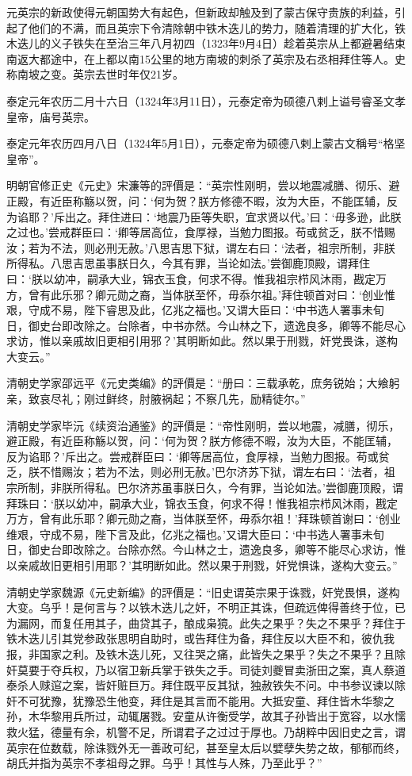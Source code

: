 元英宗的新政使得元朝国势大有起色，但新政却触及到了蒙古保守贵族的利益，引起了他们的不满，而且英宗下令清除朝中铁木迭儿的势力，随着清理的扩大化，铁木迭儿的义子铁失在至治三年八月初四（1323年9月4日）趁着英宗从上都避暑结束南返大都途中，在上都以南15公里的地方南坡的刺杀了英宗及右丞相拜住等人。史称南坡之变。英宗去世时年仅21岁。

泰定元年农历二月十六日（1324年3月11日），元泰定帝为硕德八剌上谥号睿圣文孝皇帝，庙号英宗。

泰定元年农历四月八日（1324年5月1日），元泰定帝为硕德八剌上蒙古文稱号“格坚皇帝”。

明朝官修正史《元史》宋濂等的評價是：“英宗性刚明，尝以地震减膳、彻乐、避正殿，有近臣称觞以贺，问：‘何为贺？朕方修德不暇，汝为大臣，不能匡辅，反为谄耶？’斥出之。拜住进曰：‘地震乃臣等失职，宜求贤以代。’曰：‘毋多逊，此朕之过也。’尝戒群臣曰：‘卿等居高位，食厚禄，当勉力图报。苟或贫乏，朕不惜赐汝；若为不法，则必刑无赦。’八思吉思下狱，谓左右曰：‘法者，祖宗所制，非朕所得私。八思吉思虽事朕日久，今其有罪，当论如法。’尝御鹿顶殿，谓拜住曰：‘朕以幼冲，嗣承大业，锦衣玉食，何求不得。惟我祖宗栉风沐雨，戡定万方，曾有此乐邪？卿元勋之裔，当体朕至怀，毋忝尔祖。’拜住顿首对曰：‘创业惟艰，守成不易，陛下睿思及此，亿兆之福也。’又谓大臣曰：‘中书选人署事未旬日，御史台即改除之。台除者，中书亦然。今山林之下，遗逸良多，卿等不能尽心求访，惟以亲戚故旧更相引用邪？’其明断如此。然以果于刑戮，奸党畏诛，遂构大变云。”

清朝史学家邵远平《元史类编》的評價是：“册曰：三载承乾，庶务锐始；大飨躬亲，致哀尽礼；刚过鲜终，肘腋祸起；不察几先，励精徒尔。”

清朝史学家毕沅《续资治通鉴》的評價是：“帝性刚明，尝以地震，减膳，彻乐，避正殿，有近臣称觞以贺，问：‘何为贺？朕方修德不暇，汝为大臣，不能匡辅，反为谄耶？’斥出之。尝戒群臣曰：‘卿等居高位，食厚禄，当勉力图报。苟或贫乏，朕不惜赐汝；若为不法，则必刑无赦。’巴尔济苏下狱，谓左右曰：‘法者，祖宗所制，非朕所得私。巴尔济苏虽事朕日久，今有罪，当论如法。’尝御鹿顶殿，谓拜珠曰：‘朕以幼冲，嗣承大业，锦衣玉食，何求不得！惟我祖宗栉风沐雨，戡定万方，曾有此乐耶？卿元勋之裔，当体朕至怀，毋忝尔祖！’拜珠顿首谢曰：‘创业维艰，守成不易，陛下言及此，亿兆之福也。’又谓大臣曰：‘中书选人署事未旬日，御史台即改除之。台除亦然。今山林之士，遗逸良多，卿等不能尽心求访，惟以亲戚故旧更相引用耶？’其明断如此。然以果于刑戮，奸党惧诛，遂构大变云。”

清朝史学家魏源《元史新编》的評價是：“旧史谓英宗果于诛戮，奸党畏惧，遂构大变。乌乎！是何言与？以铁木迭儿之奸，不明正其诛，但疏远俾得善终于位，已为漏网，而复任用其子，曲贷其子，酿成枭獍。此失之果乎？失之不果乎？拜住于铁木迭儿引其党参政张思明自助时，或告拜住为备，拜住反以大臣不和，彼仇我报，非国家之利。及铁木迭儿死，又往哭之痛，此皆失之果乎？失之不果乎？且除奸莫要于夺兵权，乃以宿卫新兵掌于铁失之手。司徒刘夔冒卖浙田之案，真人蔡道泰杀人赇逭之案，皆奸赃巨万。拜住既平反其狱，独赦铁失不问。中书参议谏以除奸不可犹豫，犹豫恐生他变，拜住是其言而不能用。大抵安童、拜住皆木华黎之孙，木华黎用兵所过，动辄屠戮。安童从许衡受学，故其子孙皆出于宽容，以水懦救火猛，德量有余，机警不足，所谓君子之过过于厚也。乃胡粹中因旧史之言，谓英宗在位数载，除诛戮外无一善政可纪，甚至皇太后以嬖孽失势之故，郁郁而终，胡氏并指为英宗不孝祖母之罪。乌乎！其性与人殊，乃至此乎？”

